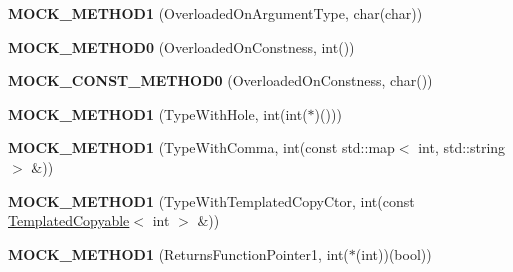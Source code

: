 \begin{DoxyCompactItemize}
{\bfseries M\+O\+C\+K\+\_\+\+M\+E\+T\+H\+O\+D1} (Overloaded\+On\+Argument\+Type, char(char))
\item 
\mbox{\label{classtesting_1_1gmock__function__mocker__test_1_1LegacyMockFoo_ae60b5b4dd84995c668572a83aaaee4c6}} 
{\bfseries M\+O\+C\+K\+\_\+\+M\+E\+T\+H\+O\+D0} (Overloaded\+On\+Constness, int())
\item 
\mbox{\label{classtesting_1_1gmock__function__mocker__test_1_1LegacyMockFoo_a072f3444d6a2257b8decc3ea65e2456c}} 
{\bfseries M\+O\+C\+K\+\_\+\+C\+O\+N\+S\+T\+\_\+\+M\+E\+T\+H\+O\+D0} (Overloaded\+On\+Constness, char())
\item 
\mbox{\label{classtesting_1_1gmock__function__mocker__test_1_1LegacyMockFoo_a4398b0decae5fe3c32e432d64c2ce00e}} 
{\bfseries M\+O\+C\+K\+\_\+\+M\+E\+T\+H\+O\+D1} (Type\+With\+Hole, int(int($\ast$)()))
\item 
\mbox{\label{classtesting_1_1gmock__function__mocker__test_1_1LegacyMockFoo_ac429e72e47753040fc7a23e5bd491a83}} 
{\bfseries M\+O\+C\+K\+\_\+\+M\+E\+T\+H\+O\+D1} (Type\+With\+Comma, int(const std\+::map$<$ int, std\+::string $>$ \&))
\item 
\mbox{\label{classtesting_1_1gmock__function__mocker__test_1_1LegacyMockFoo_a92510319821db0ceaf3e037a63df5c68}} 
{\bfseries M\+O\+C\+K\+\_\+\+M\+E\+T\+H\+O\+D1} (Type\+With\+Templated\+Copy\+Ctor, int(const \mbox{\hyperlink{classtesting_1_1gmock__function__mocker__test_1_1TemplatedCopyable}{Templated\+Copyable}}$<$ int $>$ \&))
\item 
\mbox{\label{classtesting_1_1gmock__function__mocker__test_1_1LegacyMockFoo_aea8adf40a66bbb704e4d24dbd919fdcc}} 
{\bfseries M\+O\+C\+K\+\_\+\+M\+E\+T\+H\+O\+D1} (Returns\+Function\+Pointer1, int($\ast$(int))(bool))
\item 
\mbox{\label{classtesting_1_1gmock__function__mocker__test_1_1LegacyMockFoo_a28ac0c96150878e488e87b91c58af4c6}} 

\end{DoxyCompactItemize}
